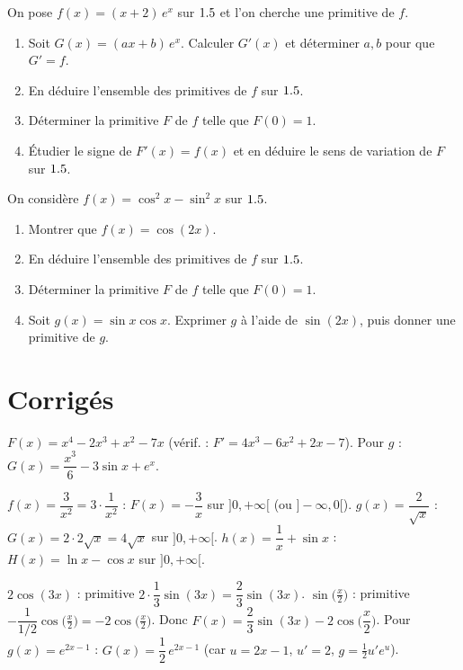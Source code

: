 On pose $f(x)=(x+2)\,e^{x}$ sur $1.5$ et l'on cherche une primitive de $f$.
\begin{enumerate}[label=\arabic*)]
\item Soit $G(x)=(ax+b)\,e^{x}$. Calculer $G'(x)$ et déterminer $a,b$ pour que $G'=f$.
\item En déduire l'ensemble des primitives de $f$ sur $1.5$.
\item Déterminer la primitive $F$ de $f$ telle que $F(0)=1$.
\item Étudier le signe de $F'(x)=f(x)$ et en déduire le sens de variation de $F$ sur $1.5$.
\end{enumerate}

On considère $f(x)=\cos^{2}x-\sin^{2}x$ sur $1.5$.
\begin{enumerate}[label=\arabic*)]
\item Montrer que $f(x)=\cos(2x)$.
\item En déduire l'ensemble des primitives de $f$ sur $1.5$.
\item Déterminer la primitive $F$ de $f$ telle que $F(0)=1$.
\item Soit $g(x)=\sin x\cos x$. Exprimer $g$ à l'aide de $\sin(2x)$, puis donner une
primitive de $g$.
\end{enumerate}

\section{Corrigés}

$F(x)=x^{4}-2x^{3}+x^{2}-7x$ (vérif. : $F'=4x^{3}-6x^{2}+2x-7$).
Pour $g$ : $G(x)=\dfrac{x^{3}}{6}-3\sin x+e^{x}$.

$f(x)=\dfrac3{x^{2}}=3\cdot\dfrac1{x^{2}}$ : $F(x)=-\dfrac3x$ sur $]0,+\infty[$ (ou $]-\infty,0[$).
$g(x)=\dfrac2{\sqrt x}$ : $G(x)=2\cdot2\sqrt x=4\sqrt x$ sur $]0,+\infty[$.
$h(x)=\dfrac1x+\sin x$ : $H(x)=\ln x-\cos x$ sur $]0,+\infty[$.

$2\cos(3x)$ : primitive $2\cdot\dfrac13\sin(3x)=\dfrac23\sin(3x)$.
$\sin\!\big(\frac x2\big)$ : primitive $-\dfrac{1}{1/2}\cos\!\big(\frac x2\big)=-2\cos\!\big(\frac x2\big)$.
Donc $F(x)=\dfrac23\sin(3x)-2\cos\!\Big(\dfrac x2\Big)$.
Pour $g(x)=e^{2x-1}$ : $G(x)=\dfrac12\,e^{2x-1}$ (car $u=2x-1$, $u'=2$, $g=\frac12 u'e^{u}$). \checkmark

